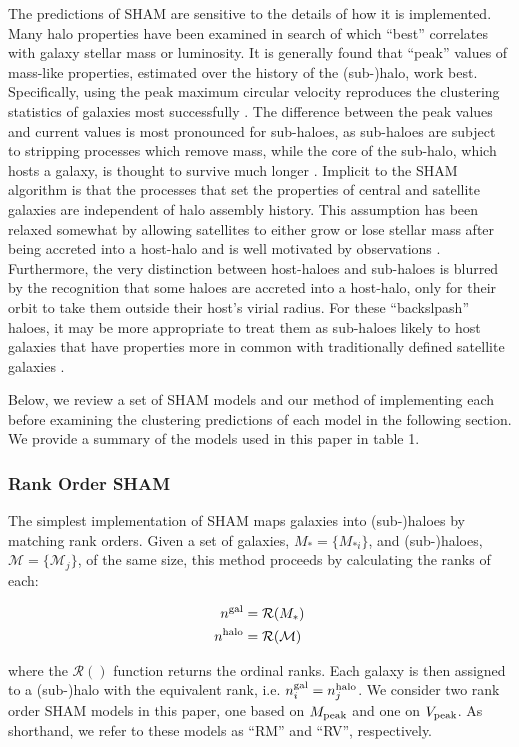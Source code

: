 \documentclass[a4paper,fleqn,usenatbib]{mnras}
\begin{document}
The predictions of SHAM are sensitive to the details of how it is implemented.  Many halo properties have been examined in search of which ``best'' correlates with galaxy stellar mass or luminosity.  It is generally found that ``peak'' values of mass-like properties, estimated over the history of the (sub-)halo, work best.  Specifically, using the peak maximum circular velocity reproduces the clustering statistics of galaxies most successfully \citep{Conroy:2006iz, Reddick:2013gi}.  The difference between the peak values and current values is most pronounced for sub-haloes, as sub-haloes are subject to stripping processes which remove mass, while the core of the sub-halo, which hosts a galaxy, is thought to survive much longer \citep[e.g.][and references therein]{Behroozi:2014bg, vandenBosch:2016cj, Jiang:2016dw, vandenBosch:2016uv}.  Implicit to the SHAM algorithm is that the processes that set the properties of central and satellite galaxies are independent of halo assembly history.  This assumption has been relaxed somewhat by allowing satellites to either grow or lose stellar mass after being accreted into a host-halo \citep{Watson:2012hw, Yang:2012ew,  Behroozi:2015wx} and is well motivated by observations \citep{Wetzel:2013dw}.  Furthermore, the very distinction between host-haloes and sub-haloes is blurred by the recognition that some haloes are accreted into a host-halo, only for their orbit to take them outside their host's virial radius.  For these ``backslpash'' haloes, it may be more appropriate to treat them as sub-haloes likely to host galaxies that have properties more in common with traditionally defined satellite galaxies \citep{Mamon:2004jy, Wetzel:2014up}.

Below, we review a set of SHAM models and our method of implementing each before examining the clustering predictions of each model in the following section.  We provide a summary of the models used in this paper in table 1.


\subsubsection{Rank Order SHAM}
\label{sec:rank_sham}

The simplest implementation of SHAM maps galaxies into (sub-)haloes by matching rank orders.  Given a set of galaxies, $M_*=\{M_{*i}\}$, and (sub-)haloes, $\mathcal{M}=\{\mathcal{M}_j\}$, of the same size, this method proceeds by calculating the ranks of each:
%
\begin{linenomath}
\begin{align}
n^{\rm gal} &= \mathcal{R}(M_*) \nonumber \\
n^{\rm halo} &= \mathcal{R}(\mathcal{M})
\end{align}
\end{linenomath}
%
where the $\mathcal{R}()$ function returns the ordinal ranks.  Each galaxy is then assigned to a (sub-)halo with the equivalent rank, i.e. $n_i^{\rm gal}=n_j^{\rm halo}$.  We consider two rank order SHAM models in this paper, one based on $M_{\rm peak}$ and one on $V_{\rm peak}$.  As shorthand, we refer to these models as ``RM'' and ``RV'', respectively. 
\end{document}
